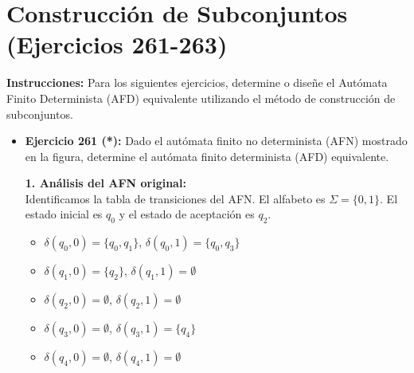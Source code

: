 \documentclass[12pt]{article}
\begin{document}
\section*{Construcción de Subconjuntos (Ejercicios 261-263)}

\textbf{Instrucciones:} Para los siguientes ejercicios, determine o diseñe el Autómata Finito Determinista (AFD) equivalente utilizando el método de construcción de subconjuntos.

\vspace{0.5cm}

\begin{itemize}
    \item \textbf{Ejercicio 261 (*):} Dado el autómata finito no determinista (AFN) mostrado en la figura, determine el autómata finito determinista (AFD) equivalente.
    
    \textbf{1. Análisis del AFN original:} \\
    Identificamos la tabla de transiciones del AFN. El alfabeto es $\Sigma=\{0, 1\}$. El estado inicial es $q_0$ y el estado de aceptación es $q_2$.
    \begin{itemize}
        \item $\delta(q_0, 0) = \{q_0, q_1\}$, $\delta(q_0, 1) = \{q_0, q_3\}$
        \item $\delta(q_1, 0) = \{q_2\}$, $\delta(q_1, 1) = \emptyset$
        \item $\delta(q_2, 0) = \emptyset$, $\delta(q_2, 1) = \emptyset$
        \item $\delta(q_3, 0) = \emptyset$, $\delta(q_3, 1) = \{q_4\}$
        \item $\delta(q_4, 0) = \emptyset$, $\delta(q_4, 1) = \emptyset$
    \end{itemize}


\end{itemize}
\end{document}
